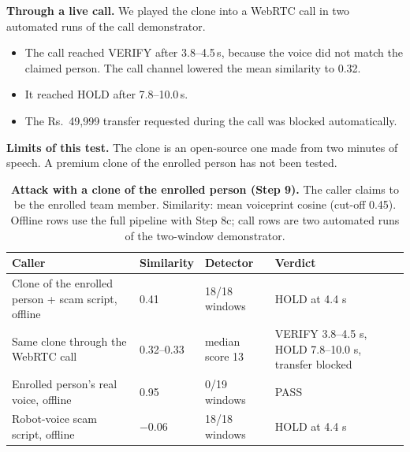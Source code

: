 \documentclass[10pt,a4paper,twocolumn]{article}
\begin{document}
\textbf{Through a live call.} We played the clone into a WebRTC call in two automated runs of the call demonstrator.
\begin{itemize}\setlength\itemsep{0pt}
\item The call reached VERIFY after 3.8--4.5\,s, because the voice did not match the claimed person. The call channel lowered the mean similarity to 0.32.
\item It reached HOLD after 7.8--10.0\,s.
\item The Rs.~49,999 transfer requested during the call was blocked automatically.
\end{itemize}

\textbf{Limits of this test.} The clone is an open-source one made from two minutes of speech. A premium clone of the enrolled person has not been tested.

\begin{table}[t]
\centering\footnotesize
\caption{\textbf{Attack with a clone of the enrolled person (Step 9).} The caller claims to be the enrolled team member. Similarity: mean voiceprint cosine (cut-off 0.45). Offline rows use the full pipeline with Step 8c; call rows are two automated runs of the two-window demonstrator.}
\label{tab:attack}
\setlength{\tabcolsep}{3pt}
\begin{tabular}{@{}p{}p{}p{}p{}@{}}
\toprule
\textbf{Caller} & \textbf{Similarity} & \textbf{Detector} & \textbf{Verdict}\\
\midrule
Clone of the enrolled person + scam script, offline & 0.41 & 18/18 windows & HOLD at 4.4 s\\
Same clone through the WebRTC call & 0.32--0.33 & median score 13 & VERIFY 3.8--4.5 s, HOLD 7.8--10.0 s, transfer blocked\\
Enrolled person's real voice, offline & 0.95 & 0/19 windows & PASS\\
Robot-voice scam script, offline & $-0.06$ & 18/18 windows & HOLD at 4.4 s\\
\bottomrule
\end{tabular}
\end{table}
\end{document}
